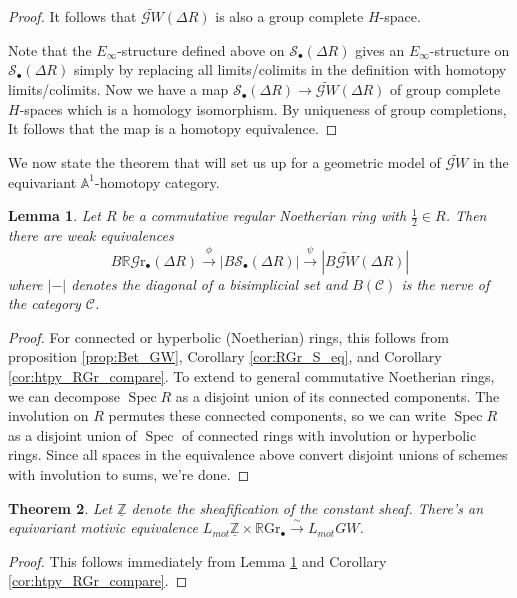 \documentclass[edeposit,fullpage]{uiucthesis2009}
\newcommand{\Z}{\mathbb Z}
\newcommand{\mbb}{\mathbb}
\newcommand{\mc}{\mathcal}
\newcommand{\RGr}{\mathbb R\mathrm{Gr}}
\newcommand{\hRGr}{\mathbb R\mathscr{G}{\mathrm{r}}}
\DeclareMathOperator{\Spec}{Spec}
\theoremstyle{plain}
\newtheorem{lemma}{Lemma}
\numberwithin{lemma}{section}
\newtheorem{theorem}[lemma]{Theorem}
\theoremstyle{definition}
\begin{document}
\begin{proof}
It follows that $\widetilde{\mathscr GW}(\Delta R)$ is also a group complete $H$-space. 

Note that the $E_\infty$-structure defined above on $\mc
S_\bullet(\Delta R)$ gives an $E_\infty$-structure on $\mathscr
S_\bullet(\Delta R)$ simply by replacing all limits/colimits in the
definition with homotopy limits/colimits. Now we have a map $\mathscr
S_\bullet(\Delta R) \rightarrow \widetilde{\mathscr GW}(\Delta R)$ of
group complete $H$-spaces which is a homology isomorphism. By
uniqueness of group completions, It follows
that the map is a homotopy equivalence. 
\end{proof}

We now state the theorem that will set us up for a geometric model of
$\widetilde{\mathscr GW}$ in the equivariant $\mbb A^1$-homotopy
category. 

\begin{lemma}\label{lem:RGr_GW}
Let $R$ be a commutative regular Noetherian ring with
$\frac{1}{2} \in R$. Then there are weak equivalences
\[
B\hRGr_\bullet(\Delta R) \xrightarrow{\phi} |B\mathscr S_\bullet(\Delta R)| \xrightarrow{\psi}
|B\widetilde{\mathscr GW}(\Delta R)|
\]
where $| - |$ denotes the diagonal of a bisimplicial set and
$B(\mathcal C)$ is
the nerve of the category $\mathcal C$. 
\end{lemma}

\begin{proof}
For connected or hyperbolic (Noetherian) rings, this follows from
proposition \ref{prop:Bet_GW}, Corollary
\ref{cor:RGr_S_eq}, and Corollary \ref{cor:htpy_RGr_compare}. To
extend to general commutative Noetherian rings, we can decompose
$\Spec R$
as a disjoint union of its connected components. The involution on $R$
permutes these connected components, so we can write $\Spec R$ as a
disjoint union of $\Spec$ of connected rings with involution or
hyperbolic rings. Since all spaces in the equivalence above convert
disjoint unions of schemes with involution to sums, we're done. 
\end{proof}



\begin{theorem}\label{thm:RGr_GW}
Let $\underline{\Z}$ denote the sheafification of the constant sheaf. There's an equivariant motivic equivalence $L_{mot}\underline{\Z}
\times \RGr_\bullet
\xrightarrow{\sim} L_{mot}GW$.
\end{theorem}
\begin{proof}
This follows immediately from Lemma \ref{lem:RGr_GW} and  Corollary \ref{cor:htpy_RGr_compare}.
\end{proof}
\end{document}
